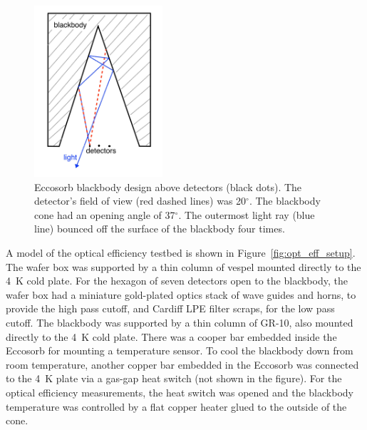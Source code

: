 \begin{figure}[htp]
\begin{center}
\includegraphics[height=2.5in]{figures/blackbody_design.jpeg}
\caption{Eccosorb blackbody design above detectors (black dots). The detector's field of view (red dashed lines) was 20$^{\circ}$. The blackbody cone had an opening angle of 37$^{\circ}$. The outermost light ray (blue line) bounced off the surface of the blackbody four times. 
\label{fig:blackbody_design} }
\end{center}
\end{figure}

A model of the optical efficiency testbed is shown in Figure~\ref{fig:opt_eff_setup}. 
The wafer box was supported by a thin column of vespel mounted directly to the 4~K cold plate. 
For the hexagon of seven detectors open to the blackbody, the wafer box had a miniature gold-plated optics stack of wave guides and horns, to provide the high pass cutoff, and Cardiff LPE filter scraps, for the low pass cutoff. 
The blackbody was supported by a thin column of GR-10, also mounted directly to the 4~K cold plate. 
There was a cooper bar embedded inside the Eccosorb for mounting a temperature sensor. %
To cool the blackbody down from room temperature, another copper bar embedded in the Eccosorb was connected to the 4~K plate via a gas-gap heat switch (not shown in the figure).
For the optical efficiency measurements, the heat switch was opened and the blackbody temperature was controlled by a flat copper heater glued to the outside of the cone.


